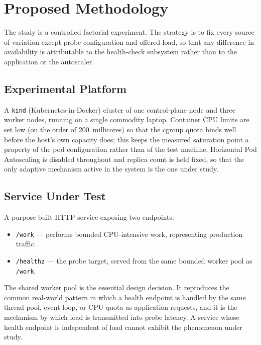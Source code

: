 \documentclass[conference]{IEEEtran}
\begin{document}
\section{Proposed Methodology}

The study is a controlled factorial experiment. The strategy is to fix
every source of variation except probe configuration and offered load,
so that any difference in availability is attributable to the health-check
subsystem rather than to the application or the autoscaler.

\subsection{Experimental Platform}

A \texttt{kind} (Kubernetes-in-Docker) cluster of one control-plane
node and three worker nodes, running on a single commodity laptop.
Container CPU limits are set low (on the order of 200~millicores) so
that the cgroup quota binds well before the host's own capacity does;
this keeps the measured saturation point a property of the pod
configuration rather than of the test machine. Horizontal Pod
Autoscaling is disabled throughout and replica count is held fixed, so
that the only adaptive mechanism active in the system is the one under
study.

\subsection{Service Under Test}

A purpose-built HTTP service exposing two endpoints:

\begin{itemize}
\item \texttt{/work} --- performs bounded CPU-intensive work,
representing production traffic.
\item \texttt{/healthz} --- the probe target, served from the same
bounded worker pool as \texttt{/work}.
\end{itemize}

The shared worker pool is the essential design decision. It reproduces
the common real-world pattern in which a health endpoint is handled by
the same thread pool, event loop, or CPU quota as application
requests, and it is the mechanism by which load is transmitted into
probe latency. A service whose health endpoint is independent of load
cannot exhibit the phenomenon under study.
\end{document}
